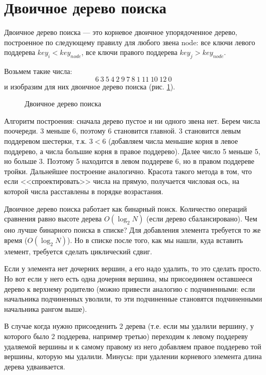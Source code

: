 \documentclass[a4paper,12pt]{article}
\theoremstyle{plain} %
\theoremstyle{definition} %
\theoremstyle{remark} %
\begin{document}
\section{Двоичное дерево поиска}
\textsf{Двоичное дерево поиска} --- это корневое двоичное упорядоченное дерево, построенное по следующему правилу для любого звена node: все ключи левого поддерева $key_i<key_{node}$, все ключи правого поддерева $key_j>key_{node}$.

Возьмем такие числа:
$$
6\ 3\ 5\ 4\ 2\ 9\ 7\ 8\ 1\ 11\ 10\ 12\ 0
$$
и изобразим для них двоичное дерево поиска (рис. \ref{fig_dvderevo}).

\begin{figure}
	\centering
	\def\svgwidth{17cm} %
	
	\caption{Двоичное дерево поиска}
	\label{fig_dvderevo}
\end{figure}

Алгоритм построения: сначала дерево пустое и ни одного звена нет. Берем числа поочереди. 3 меньше 6, поэтому 6 становится главной. 3 становится левым поддеревом шестерки, т.к. $3<6$ (добавляем числа меньшие корня в левое поддерево, а числа большие корня в правое поддерево). Далее число 5 меньше 5, но больше 3. Поэтому 5 находится в левом поддереве 6, но в правом поддереве тройки. Дальнейшее построение аналогично. Красота такого метода в том, что если <<спроектировать>> числа на прямую, получается числовая ось, на которой числа расставлены в порядке возрастания.

Двоичное дерево поиска работает как бинарный поиск. Количество операций сравнения равно высоте дерева $O(\log_2N)$ (если дерево сбалансировано). Чем оно лучше бинарного поиска в списке? Для добавления элемента требуется то же время ($O(\log_2N)$). Но в списке после того, как мы нашли, куда вставить элемент, требуется сделать циклический сдвиг.

Если у элемента нет дочерних вершин, а его надо удалить, то это сделать просто. Но вот если у него есть одна дочерняя вершина, мы присоединяем оставшееся дерево к верхнему родителю (можно привести аналогию с подчиненными: если начальника подчиненных уволили, то эти подчиненные становятся подчиненными начальника рангом выше).

В случае когда нужно присоеденить 2 дерева (т.е. если мы удалили вершину, у которого было 2 поддерева, например третью) переходим к левому поддереву удаляемой вершины и к самому правому из него добавляем правое поддерево той вершины, которую мы удалили. Минусы: при удалении корневого элемента длина дерева удваивается.
\end{document}
